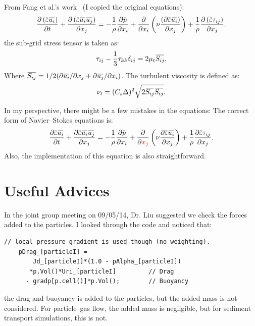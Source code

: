 \documentclass[11pt]{article}
\newcommand{\overbar}[1]{\mkern 1.5mu\overline{\mkern-1.5mu#1\mkern-1.5mu}\mkern 1.5mu}
\begin{document}
  From Fang et al.'s work~\cite{fang13li} (I copied the original equations):
  \begin{equation}
    \frac{\partial \left(\overbar{\varepsilon}\overbar{u_i}\right)}{\partial t}
    +\frac{\partial \left(\overbar{\varepsilon}\overbar{u_i} 
     \overbar{u_j}\right)}{\partial x_j} = 
    - \frac{1}{\rho}\frac{\partial \overbar{p}}{\partial x_i}
    + \frac{\partial}{\partial x_i}\left(\nu\frac{\left(\partial 
      \overbar{\varepsilon}\overbar{u_i}\right)}{\partial x_j}\right)
      + \frac{1}{\rho}\frac{\partial \left(\overbar{\varepsilon}\tau_{ij}\right)}{\partial x_j}.
  \label{eqn:NS-DEM-filtered}
  \end{equation}
  the sub-grid stress tensor is taken as:
  \begin{equation}
    \tau_{ij}-\frac{1}{3}\tau_{kk}\delta_{ij} = 2 \mu_t \overbar{S_{ij}},
  \label{eqn:NS-DEM-tauij}
  \end{equation}
  Where $\overbar{S_{ij}} = 1/2 (\partial \overbar{u_i}/\partial x_j + \partial
  \overbar{u_j}/\partial x_i)$. The turbulent viscosity is defined as:
  \begin{equation}
    \nu_t = (C_s \Delta)^2\sqrt{2\overbar{S_{ij}}\overbar{S_{ij}}}.
  \label{eqn:NS-LES-2}
  \end{equation}

  In my perspective, there might be a few mistakes in the equations:
  The correct form of Navier--Stokes equations is:
  \begin{equation}
    \frac{\partial \overbar{\varepsilon}\overbar{u_i}}{\partial t}
    +\frac{\partial \overbar{\varepsilon}\overbar{u_i} \overbar{u_j}}{\partial x_j} = 
    - \frac{1}{\rho}\frac{\partial \overbar{p}}{\partial x_i}
    + \frac{\partial}{\partial {\color{red}x_j}}\left(\nu\frac{\partial 
      \overbar{\varepsilon}\overbar{u_i}}{\partial x_j}\right)
      + \frac{1}{\rho}\frac{\partial \overbar{\varepsilon}\tau_{ij}}{\partial x_j}.
  \label{eqn:NS-DEM-filtered-corrected}
  \end{equation}
  Also, the implementation of this equation is also straightforward.


\section{Useful Advices}
  In the joint group meeting on 09/05/14, Dr. Liu suggested we check the forces added to the
  particles. I looked through the code and noticed that:
\begin{lstlisting}[basicstyle=\ttfamily\scriptsize]
    // local pressure gradient is used though (no weighting).
    pDrag_[particleI] =
        Jd_[particleI]*(1.0 - pAlpha_[particleI])
       *p.Vol()*Uri_[particleI]         // Drag
      - gradp[p.cell()]*p.Vol();        // Buoyancy

\end{lstlisting}
  the drag and buoyancy is added to the particles, but the added mass is not considered. For
  particle--gas flow, the added mass is negligible, but for sediment transport simulations, this is
  not.
\end{document}

